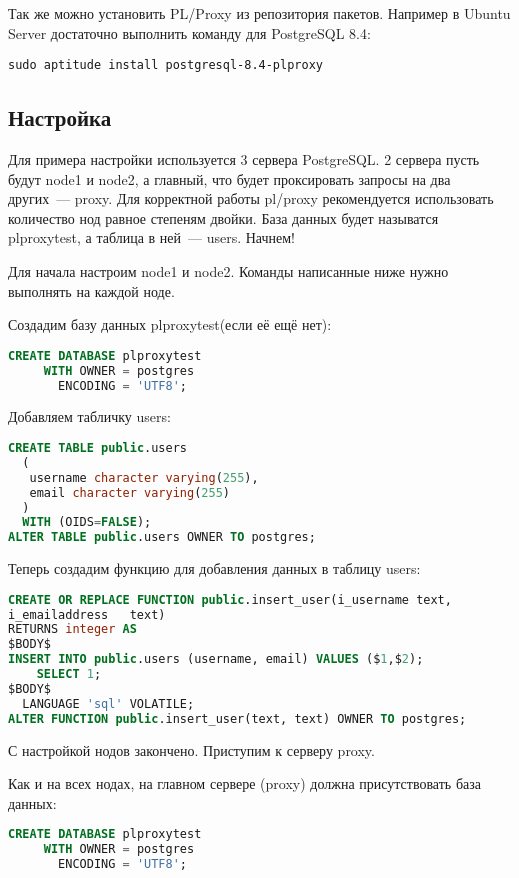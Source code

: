 Так же можно установить PL/Proxy из репозитория пакетов.
Например в Ubuntu Server достаточно выполнить команду для PostgreSQL 8.4:
\begin{lstlisting}[label=lst:plproxy1,caption=Установка]
sudo aptitude install postgresql-8.4-plproxy
\end{lstlisting}

\subsection{Настройка}
Для примера настройки используется 3 сервера PostgreSQL. 2 сервера пусть будут node1 и node2,
а главный, что будет проксировать запросы на два других~--- proxy.
Для корректной работы pl/proxy рекомендуется использовать количество нод равное степеням двойки.
База данных будет называтся plproxytest, а таблица в ней~--- users. Начнем!

Для начала настроим node1 и node2. Команды написанные ниже нужно выполнять на каждой ноде.

Создадим базу данных plproxytest(если её ещё нет):
\begin{lstlisting}[language=SQL,label=lst:plproxy2,caption=Настройка]
CREATE DATABASE plproxytest
     WITH OWNER = postgres
       ENCODING = 'UTF8';
\end{lstlisting}

Добавляем табличку users:
\begin{lstlisting}[language=SQL,label=lst:plproxy3,caption=Настройка]
CREATE TABLE public.users
  (
   username character varying(255),
   email character varying(255)
  )
  WITH (OIDS=FALSE);
ALTER TABLE public.users OWNER TO postgres;
\end{lstlisting}

Теперь создадим функцию для добавления данных в таблицу users:
\begin{lstlisting}[language=SQL,label=lst:plproxy4,caption=Настройка]
CREATE OR REPLACE FUNCTION public.insert_user(i_username text,
i_emailaddress   text)
RETURNS integer AS
$BODY$
INSERT INTO public.users (username, email) VALUES ($1,$2);
    SELECT 1;
$BODY$
  LANGUAGE 'sql' VOLATILE;
ALTER FUNCTION public.insert_user(text, text) OWNER TO postgres;
\end{lstlisting}

С настройкой нодов закончено. Приступим к серверу proxy.

Как и на всех нодах, на главном сервере (proxy) должна присутствовать база данных:
\begin{lstlisting}[language=SQL,label=lst:plproxy5,caption=Настройка]
CREATE DATABASE plproxytest
     WITH OWNER = postgres
       ENCODING = 'UTF8';
\end{lstlisting}

